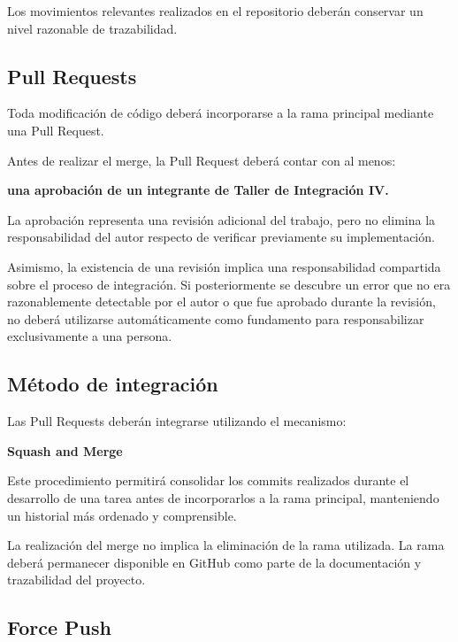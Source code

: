 \documentclass[12pt,a4paper]{article}
\begin{document}
Los movimientos relevantes realizados en el repositorio deberán conservar un nivel razonable de trazabilidad.

\subsection{Pull Requests}

Toda modificación de código deberá incorporarse a la rama principal mediante una Pull Request.

Antes de realizar el merge, la Pull Request deberá contar con al menos:

\begin{center}
    \textbf{una aprobación de un integrante de Taller de Integración IV.}
\end{center}

La aprobación representa una revisión adicional del trabajo, pero no elimina la responsabilidad del autor respecto de verificar previamente su implementación.

Asimismo, la existencia de una revisión implica una responsabilidad compartida sobre el proceso de integración. Si posteriormente se descubre un error que no era razonablemente detectable por el autor o que fue aprobado durante la revisión, no deberá utilizarse automáticamente como fundamento para responsabilizar exclusivamente a una persona.

\subsection{Método de integración}

Las Pull Requests deberán integrarse utilizando el mecanismo:

\begin{center}
    \textbf{Squash and Merge}
\end{center}

Este procedimiento permitirá consolidar los commits realizados durante el desarrollo de una tarea antes de incorporarlos a la rama principal, manteniendo un historial más ordenado y comprensible.

La realización del merge no implica la eliminación de la rama utilizada. La rama deberá permanecer disponible en GitHub como parte de la documentación y trazabilidad del proyecto.

\subsection{Force Push}
\end{document}
